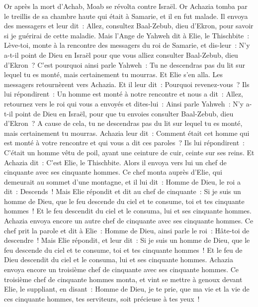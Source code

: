 \begin{multicols}{2}
\VerseOne{}Or après la mort d'Achab, Moab se révolta contre Israël.
Or Achazia tomba par le treillis de sa chambre haute qui était à Samarie, et il en fut malade. Il envoya des messagers et leur dit~: Allez, consultez Baal-Zebub, dieu d'Ekron, pour savoir si je guérirai de cette maladie.
Mais l'Ange de Yahweh dit à Elie, le Thischbite~: Lève-toi, monte à la rencontre des messagers du roi de Samarie, et dis-leur~: N'y a-t-il point de Dieu en Israël pour que vous alliez consulter Baal-Zebub, dieu d'Ekron~?
C'est pourquoi ainsi parle Yahweh~: Tu ne descendras pas du lit sur lequel tu es monté, mais certainement tu mourras. Et Elie s'en alla.
Les messagers retournèrent vers Achazia. Et il leur dit~: Pourquoi revenez-vous~?
Ils lui répondirent~: Un homme est monté à notre rencontre et nous a dit~: Allez, retournez vers le roi qui vous a envoyés et dites-lui~: Ainsi parle Yahweh~: N'y a-t-il point de Dieu en Israël, pour que tu envoies consulter Baal-Zebub, dieu d'Ekron~? A cause de cela, tu ne descendras pas du lit sur lequel tu es monté, mais certainement tu mourras.
Achazia leur dit~: Comment était cet homme qui est monté à votre rencontre et qui vous a dit ces paroles~?
Ils lui répondirent~: C'était un homme vêtu de poil, ayant une ceinture de cuir, ceinte sur ses reins. Et Achazia dit~: C'est Elie, le Thischbite.
Alors il envoya vers lui un chef de cinquante avec ses cinquante hommes. Ce chef monta auprès d'Elie, qui demeurait au sommet d'une montagne, et il lui dit~: Homme de Dieu, le roi a dit~: Descends~!
Mais Elie répondit et dit au chef de cinquante~: Si je suis un homme de Dieu, que le feu descende du ciel et te consume, toi et tes cinquante hommes~! Et le feu descendit du ciel et le consuma, lui et ses cinquante hommes.
Achazia envoya encore un autre chef de cinquante avec ses cinquante hommes. Ce chef prit la parole et dit à Elie~: Homme de Dieu, ainsi parle le roi~: Hâte-toi de descendre~!
Mais Elie répondit, et leur dit~: Si je suis un homme de Dieu, que le feu descende du ciel et te consume, toi et tes cinquante hommes~! Et le feu de Dieu descendit du ciel et le consuma, lui et ses cinquante hommes.
Achazia envoya encore un troisième chef de cinquante avec ses cinquante hommes. Ce troisième chef de cinquante hommes monta, et vint se mettre à genoux devant Elie, le suppliant, en disant~: Homme de Dieu, je te prie, que ma vie et la vie de ces cinquante hommes, tes serviteurs, soit précieuse à tes yeux~!

\end{multicols}
